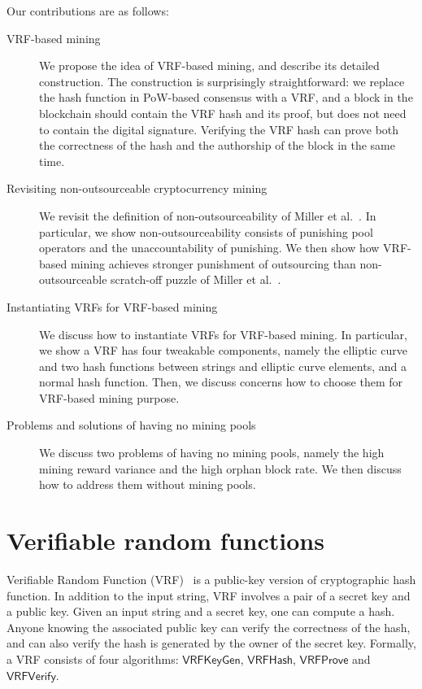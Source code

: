 \documentclass[a0,portrait]{a0poster}
\begin{document}
\begin{multicols}{2}
Our contributions are as follows:

\begin{description}
    \item [VRF-based mining] We propose the idea of VRF-based mining, and describe its detailed construction. The construction is surprisingly straightforward: we replace the hash function in PoW-based consensus with a VRF, and a block in the blockchain should contain the VRF hash and its proof, but does not need to contain the digital signature. Verifying the VRF hash can prove both the correctness of the hash and the authorship of the block in the same time.
    \item [Revisiting non-outsourceable cryptocurrency mining] We revisit the definition of non-outsourceability of Miller et al.~\cite{miller2015nonoutsourceable}. In particular, we show non-outsourceability consists of punishing pool operators and the unaccountability of punishing. We then show how VRF-based mining achieves stronger punishment of outsourcing than non-outsourceable scratch-off puzzle of Miller et al.~\cite{miller2015nonoutsourceable}.
    \item [Instantiating VRFs for VRF-based mining] We discuss how to instantiate VRFs for VRF-based mining. In particular, we show a VRF has four tweakable components, namely the elliptic curve and two hash functions between strings and elliptic curve elements, and a normal hash function. Then, we discuss concerns how to choose them for VRF-based mining purpose.
    \item [Problems and solutions of having no mining pools] We discuss two problems of having no mining pools, namely the high mining reward variance and the high orphan block rate. We then discuss how to address them without mining pools.
\end{description}




\color{DarkSlateGray} %

\section*{Verifiable random functions}
Verifiable Random Function (VRF)~\cite{micali1999verifiable} is a public-key version of cryptographic hash function.
In addition to the input string, VRF involves a pair of a secret key and a public key.
Given an input string and a secret key, one can compute a hash.
Anyone knowing the associated public key can verify the correctness of the hash, and can also verify the hash is generated by the owner of the secret key.
Formally, a VRF consists of four algorithms: $\mathsf{VRFKeyGen}$, $\mathsf{VRFHash}$, $\mathsf{VRFProve}$ and $\mathsf{VRFVerify}$.


\end{multicols}
\end{document}
